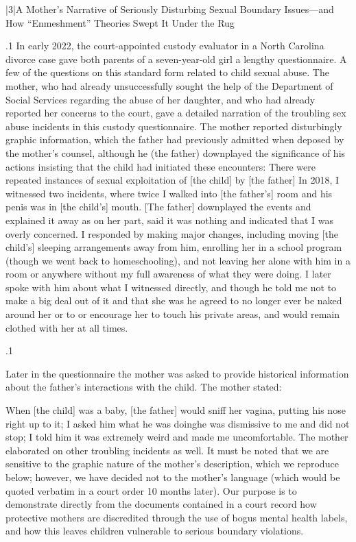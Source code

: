 \documentclass[11pt, twoside]{article}
\begin{document}
{\s|3|{A Mother’s Narrative of Seriously Disturbing Sexual Boundary Issues---and How ``Enmeshment'' Theories Swept It Under the Rug}

\p.1{%
In early 2022, the court-appointed custody evaluator in a North Carolina divorce case gave both parents of a seven-year-old girl a lengthy
questionnaire. A few of the questions on this standard form related to
child sexual abuse. The mother, who had already unsuccessfully sought
the help of the Department of Social Services regarding the abuse of her
daughter, and who had already reported her concerns to the court, gave
a detailed narration of the troubling sex abuse incidents in this custody
questionnaire. The mother reported disturbingly graphic information,
which the father had previously admitted when deposed by the mother’s
counsel, although he (the father) downplayed the significance of his
actions insisting that the child had initiated these encounters:
There were repeated instances of sexual exploitation of [the child]
by [the father]\ellFour{2pt}{2pt} In 2018, I witnessed two incidents, where twice
I walked into [the father’s] room and his penis was in [the child’s]
mouth. [The father] downplayed the events and explained it away
as  on her part, said it was nothing and indicated that
I was overly concerned. I responded by making major changes,
including moving [the child’s] sleeping arrangements away from
him, enrolling her in a school program (though we went back to
homeschooling), and not leaving her alone with him in a room or
anywhere without my full awareness of what they were doing. I
later spoke with him about what I witnessed directly, and though
he told me not to make a big deal out of it and that she was  he agreed to no longer ever be naked around her or to  or encourage her to touch his private areas, and would remain
clothed with her at all times.
}%

\p.1{%
Later in the questionnaire the mother was asked to provide historical
information about the father’s interactions with the child. The mother
stated:

\begin{blockQuote}
When [the child] was a baby, [the father] would sniff her vagina,
putting his nose right up to it; I asked him what he was doing\mdash{}he
was dismissive to me and did not stop; I told him it was extremely
weird and made me uncomfortable.
The mother elaborated on other troubling incidents as well. It must
be noted that we are sensitive to the graphic nature of the mother’s
description, which we reproduce below; however, we have decided not
to  the mother’s language (which would be quoted verbatim
in a court order 10 months later). Our purpose is to demonstrate directly from the documents contained in a court record how protective
mothers are discredited through the use of bogus mental health labels,
and how this leaves children vulnerable to serious boundary violations.
\end{blockQuote}

}}
\end{document}
